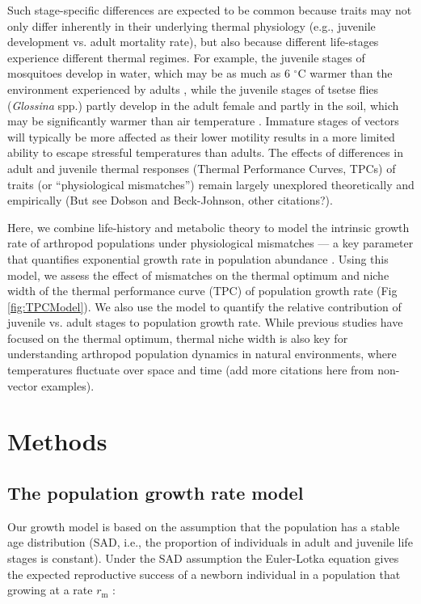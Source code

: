Such stage-specific differences are expected to be common because traits may not only differ inherently in their underlying thermal physiology (e.g., juvenile development vs. adult mortality rate), but also because different life-stages experience different thermal regimes. For example, the juvenile stages of mosquitoes develop in water, which may be as much as 6 $^\circ$C warmer than the environment experienced by adults \citep{Paaijmans2010d}, while the juvenile stages of tsetse flies ({\it Glossina} spp.) partly develop in the adult female and partly in the soil, which may be significantly warmer than air temperature \citep{Kleynhans2014}. Immature stages of vectors will typically be more affected as their lower motility results in a more limited ability to escape stressful temperatures than adults. The effects of differences in adult and juvenile thermal responses (Thermal Performance Curves, TPCs) of traits (or ``physiological mismatches'') remain largely unexplored theoretically and empirically (But see Dobson and Beck-Johnson, other citations?).

Here, we combine life-history and metabolic theory to model the intrinsic growth rate of arthropod populations under physiological mismatches --- a key parameter that quantifies exponential growth rate in population abundance \citep{Birch1948, Savage2004d, Amarasekare2012a}. Using this model, we assess the effect of mismatches on the thermal optimum and niche width of the thermal performance curve (TPC) of population growth rate (Fig \ref{fig:TPCModel}). We also use the model to quantify the relative contribution of juvenile vs. adult stages to population growth rate. While previous studies have focused on the thermal optimum, thermal niche width is also key for understanding arthropod  population dynamics in natural environments, where temperatures fluctuate over space and time \citep{Paaijmans2010d,Paaijmans2013} (add more citations here from non-vector examples).



\section*{Methods} 

\subsection*{The population growth rate model}

Our growth model is based on the assumption that the population has a stable age distribution (SAD, i.e., the proportion of individuals in adult and juvenile life stages is constant). Under the SAD assumption the Euler-Lotka equation gives the expected reproductive success of a newborn individual in a population that growing at a rate $r_\text{m}$ \citep{Charnov1993a, Savage2004d, Amarasekare2012a, Amarasekare2013}:

